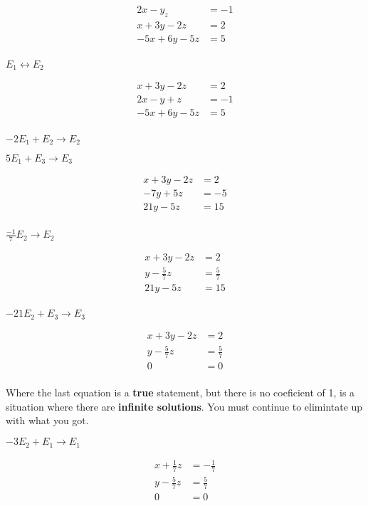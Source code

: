 \begin{example}[3]
	\begin{align*}
		2x -y _ z &= -1 \\
		x +3y -2z &= 2 \\
		-5x + 6y -5z &= 5 \\
	\end{align*}

	$E_1 \leftrightarrow E_2$

	\begin{align*}
		x +3y -2z &= 2 \\
		2x -y + z &= -1 \\
		-5x + 6y -5z &= 5 \\
	\end{align*}


$-2E_1 + E_2 \to E_2$

$5E_1+E_3 \to E_3$

	\begin{align*}
		x +3y -2z &= 2 \\
		-7y + 5z &= -5 \\
		21y -5z &= 15 \\
	\end{align*}

	$\frac{-1}{7}E_2 \to E_2$

	\begin{align*}
		x +3y -2z &= 2 \\
		y - \frac{5}{7}z &= \frac{5}{7} \\
		21y -5z &= 15 \\
	\end{align*}

	$- 21 E_2 + E_3 \to E_3$

	\begin{align*}
		x +3y -2z &= 2 \\
		y - \frac{5}{7}z &= \frac{5}{7} \\
		0 &= 0 \\
	\end{align*}

Where the last equation is a \textbf{true} statement, but there is no coeficient of 1,
is a situation where there are \textbf{infinite solutions}. You must continue to elimintate up with
what you got.

$ -3E_2+ E_1 \to E_1$

	\begin{align*}
		x + \frac{1}{7}z &= - \frac{1}{7} \\
		y - \frac{5}{7}z &= \frac{5}{7} \\
		0 &= 0 \\
	\end{align*}


\end{example}
